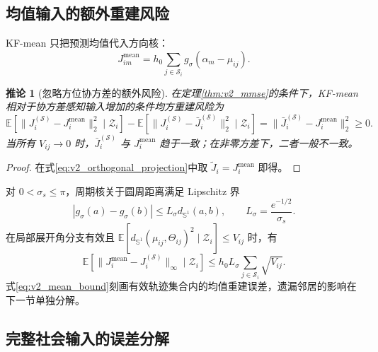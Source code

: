 \documentclass[UTF8,fontset=windows,11pt]{ctexart}
\newtheorem{corollary}[theorem]{推论}
\newcommand{\Sone}{\mathbb S^1}
\newcommand{\E}{\mathbb E}
\begin{document}
\subsection{均值输入的额外重建风险}

KF-mean 只把预测均值代入方向核：
\begin{equation}
 J_{im}^{\mathrm{mean}}=h_0\sum_{j\in\mathcal S_i}
 g_\sigma(\alpha_m-\mu_{ij}).
 \label{eq:v2_mean_input}
\end{equation}

\begin{corollary}[忽略方位协方差的额外风险]
\label{cor:v2_mean_risk}
在定理\ref{thm:v2_mmse}的条件下，KF-mean 相对于协方差感知输入增加的条件均方重建风险为
\begin{equation}
 \E[\|J_i^{(\mathcal S)}-J_i^{\mathrm{mean}}\|_2^2\mid\mathcal Z_i]
 -\E[\|J_i^{(\mathcal S)}-\bar J_i^{(\mathcal S)}\|_2^2\mid\mathcal Z_i]
 =\|\bar J_i^{(\mathcal S)}-J_i^{\mathrm{mean}}\|_2^2\ge0.
 \label{eq:v2_mean_risk_gap}
\end{equation}
当所有 $V_{ij}\to0$ 时，$\bar J_i^{(\mathcal S)}$ 与 $J_i^{\mathrm{mean}}$ 趋于一致；在非零方差下，二者一般不一致。
\end{corollary}

\begin{proof}
在式\eqref{eq:v2_orthogonal_projection}中取 $\widetilde J_i=J_i^{\mathrm{mean}}$ 即得。
\end{proof}

对 $0<\sigma_s\le\pi$，周期核关于圆周距离满足 Lipschitz 界
\begin{equation}
 |g_\sigma(a)-g_\sigma(b)|
 \le L_\sigma d_{\Sone}(a,b),
 \qquad L_\sigma=\frac{e^{-1/2}}{\sigma_s}.
 \label{eq:v2_lipschitz_kernel}
\end{equation}
在局部展开角分支有效且 $\E[d_{\Sone}(\mu_{ij},\Theta_{ij})^2\mid\mathcal Z_i]\le V_{ij}$ 时，有
\begin{equation}
 \E[\|J_i^{\mathrm{mean}}-J_i^{(\mathcal S)}\|_\infty\mid\mathcal Z_i]
 \le h_0L_\sigma\sum_{j\in\mathcal S_i}\sqrt{V_{ij}}.
 \label{eq:v2_mean_bound}
\end{equation}
式\eqref{eq:v2_mean_bound}刻画有效轨迹集合内的均值重建误差，遗漏邻居的影响在下一节单独分解。

\subsection{完整社会输入的误差分解}
\end{document}
